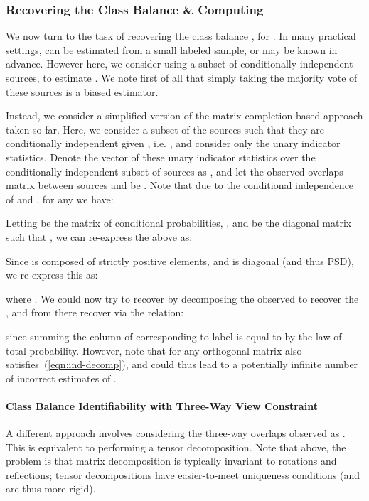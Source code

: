 \documentclass[letterpaper]{article}
\begin{document}
\begin{appendix}
\subsubsection{Recovering the Class Balance  \& Computing }
\label{appendix:recovering-class-balance}
We now turn to the task of recovering the class balance , for .
In many practical settings,  can be estimated from a small labeled sample, or may be known in advance.
However here, we consider using a subset of conditionally independent sources,  to estimate .
We note first of all that simply taking the majority vote of these sources is a biased estimator.

Instead, we consider a simplified version of the matrix completion-based approach taken so far.
Here, we consider a subset of the sources  such that they are conditionally independent given , i.e. , and consider only the unary indicator statistics.
Denote the vector of these unary indicator statistics over the conditionally independent subset of sources as , and let the observed overlaps matrix between sources  and  be .
Note that due to the conditional independence of  and , for any  we have:

Letting  be the  matrix of conditional probabilities, , and  be the diagonal matrix such that , we can re-express the above as:

Since  is composed of strictly positive elements, and is diagonal (and thus PSD), we re-express this as:

where .
We could now try to recover  by decomposing the observed  to recover the , and from there recover  via the relation:

since summing the column of  corresponding to label  is equal to  by the law of total probability.
However, note that  for any orthogonal matrix  also satisfies~(\ref{eqn:ind-decomp}), and could thus lead to a potentially infinite number of incorrect estimates of .

\paragraph*{Class Balance Identifiability with Three-Way View Constraint}
A different approach involves considering the three-way overlaps observed as .
This is equivalent to performing a tensor decomposition.
Note that above, the problem is that matrix decomposition is typically invariant to rotations and reflections; tensor decompositions have easier-to-meet uniqueness conditions (and are thus more rigid).


\end{appendix}
\end{document}
